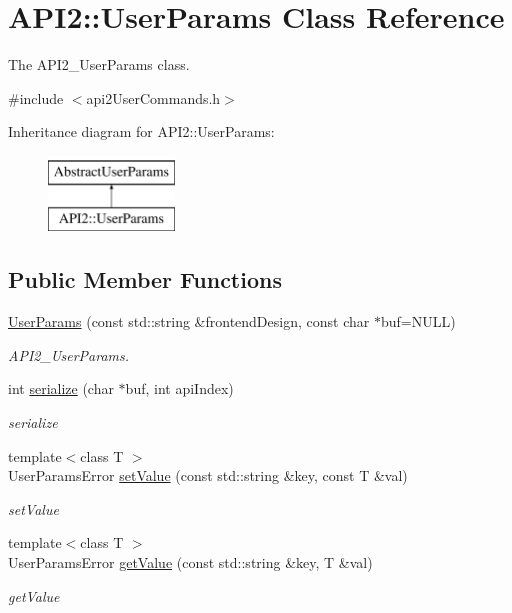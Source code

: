 \hypertarget{class_a_p_i2_1_1_user_params}{\section{A\-P\-I2\-:\-:User\-Params Class Reference}
\label{class_a_p_i2_1_1_user_params}
}


The A\-P\-I2\-\_\-\-User\-Params class.  




{\ttfamily \#include $<$api2\-User\-Commands.\-h$>$}

Inheritance diagram for A\-P\-I2\-:\-:User\-Params\-:\begin{figure}[H]
\begin{center}
\leavevmode
\includegraphics[height=2.000000cm]{class_a_p_i2_1_1_user_params}
\end{center}
\end{figure}
\subsection*{Public Member Functions}
\begin{DoxyCompactItemize}
\item 
\hyperlink{class_a_p_i2_1_1_user_params_a99f3b245caaae652926cc585182c83e2}{User\-Params} (const std\-::string \&frontend\-Design, const char $\ast$buf=N\-U\-L\-L)
\begin{DoxyCompactList}\small\item\em A\-P\-I2\-\_\-\-User\-Params. \end{DoxyCompactList}\item 
int \hyperlink{class_a_p_i2_1_1_user_params_a3d046f602053a684cfa7d9b27018afe4}{serialize} (char $\ast$buf, int api\-Index)
\begin{DoxyCompactList}\small\item\em serialize \end{DoxyCompactList}\item 
{\footnotesize template$<$class T $>$ }\\User\-Params\-Error \hyperlink{class_a_p_i2_1_1_user_params_a4c04efbed71fffeda8248da31a44060d}{set\-Value} (const std\-::string \&key, const T \&val)
\begin{DoxyCompactList}\small\item\em set\-Value \end{DoxyCompactList}\item 
{\footnotesize template$<$class T $>$ }\\User\-Params\-Error \hyperlink{class_a_p_i2_1_1_user_params_a3019a2130c8e8472eafaa7d99b235574}{get\-Value} (const std\-::string \&key, T \&val)
\begin{DoxyCompactList}\small\item\em get\-Value \end{DoxyCompactList}\end{DoxyCompactItemize}


